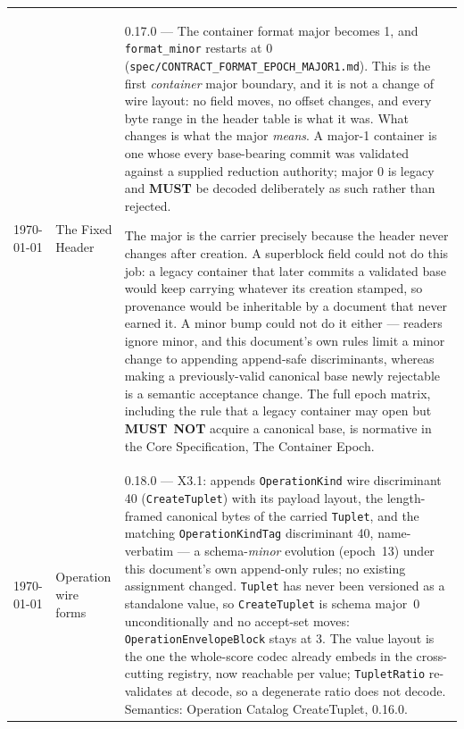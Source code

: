 \documentclass[11pt,letterpaper]{report}
\newcommand{\tablenums}[1]{{\addfontfeatures{Numbers={Lining,Tabular}}#1}}
\newcommand{\sectionsc}[1]{{\addfontfeatures{Letters=SmallCaps}#1}}
\newcommand{\MUST}{\textbf{MUST}}
\newcommand{\MUSTNOT}{\textbf{MUST}\nobreak\ \textbf{NOT}}
\begin{document}
\begin{longtable}{p{2cm} p{2.5cm} p{9cm}}
    \today & The Fixed Header & 0.17.0 --- The container format major becomes
  \tablenums{1}, and \texttt{format\_minor} restarts at \tablenums{0}
  (\texttt{spec/CONTRACT\_FORMAT\_EPOCH\_MAJOR1.md}). This is the first
  \emph{container} major boundary, and it is not a change of wire layout: no
  field moves, no offset changes, and every byte range in the header table is
  what it was. What changes is what the major \emph{means}. A major-1 container
  is one whose every base-bearing commit was validated against a supplied
  reduction authority; major \tablenums{0} is legacy and \MUST{} be decoded
  deliberately as such rather than rejected.

  The major is the carrier precisely because the header never changes after
  creation. A superblock field could not do this job: a legacy container that
  later commits a validated base would keep carrying whatever its creation
  stamped, so provenance would be inheritable by a document that never earned
  it. A minor bump could not do it either --- readers ignore minor, and this
  document's own rules limit a minor change to appending append-safe
  discriminants, whereas making a previously-valid canonical base newly
  rejectable is a semantic acceptance change. The full epoch matrix, including
  the rule that a legacy container may open but \MUSTNOT{} acquire a canonical
  base, is normative in the Core Specification,
  \sectionsc{The Container Epoch}. \\

    \today & Operation wire forms & 0.18.0 --- X3.1: appends
  \texttt{OperationKind} wire discriminant \tablenums{40}
  (\texttt{CreateTuplet}) with its payload layout, the length-framed
  canonical bytes of the carried \texttt{Tuplet}, and the matching
  \texttt{OperationKindTag} discriminant \tablenums{40}, name-verbatim --- a
  schema-\emph{minor} evolution (epoch~13) under this document's own
  append-only rules; no existing assignment changed. \texttt{Tuplet} has never
  been versioned as a standalone value, so \texttt{CreateTuplet} is schema
  major~0 unconditionally and no accept-set moves:
  \texttt{OperationEnvelopeBlock} stays at \tablenums{3}. The value layout is
  the one the whole-score codec already embeds in the cross-cutting registry,
  now reachable per value; \texttt{TupletRatio} re-validates at decode, so a
  degenerate ratio does not decode. Semantics: Operation Catalog
  \sectionsc{CreateTuplet}, 0.16.0. \\


\end{longtable}
\end{document}
